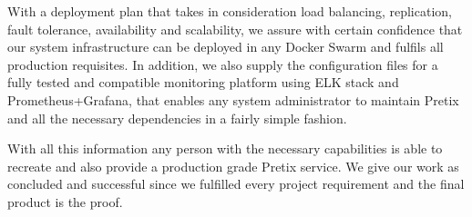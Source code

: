 \documentclass[12pt]{article}
\begin{document}
With a deployment plan that takes in consideration load balancing, replication, fault tolerance, availability and scalability, we assure with certain confidence that our system infrastructure can be deployed in any Docker Swarm and fulfils all production requisites. In addition, we also supply the configuration files for a fully tested and compatible monitoring platform using ELK stack and Prometheus+Grafana, that enables any system administrator to maintain Pretix and all the necessary dependencies in a fairly simple fashion.

With all this information any person with the necessary capabilities is able to recreate and also provide a production grade Pretix service. We give our work as concluded and successful since we fulfilled every project requirement and the final product is the proof.
\end{document}
